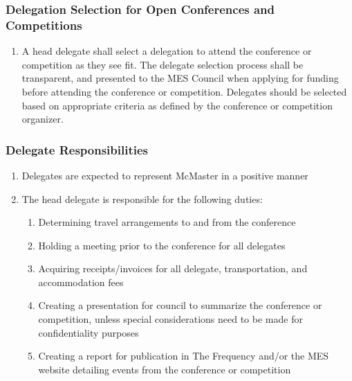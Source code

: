 \subsubsection{Delegation Selection for Open Conferences and Competitions}
\label{delegation-selection-for-open-conferences-and-competitions}

\begin{enumerate}
 \item
  A head delegate shall select a delegation to attend the conference or competition as they see fit. The delegate selection process shall be transparent, and presented to the MES Council when applying for funding before attending the conference or competition. Delegates should be selected based on appropriate criteria as defined by the conference or competition organizer.
\end{enumerate}

\subsubsection{Delegate Responsibilities}
\label{delegate-responsibilities}
\begin{enumerate}
 \item
  Delegates are expected to represent McMaster in a positive manner
 \item
  The head delegate is responsible for the following duties:

  \begin{enumerate}
   \item
    Determining travel arrangements to and from the conference
   \item
    Holding a meeting prior to the conference for all delegates
   \item
    Acquiring receipts/invoices for all delegate, transportation, and accommodation fees
   \item
    Creating a presentation for council to summarize the conference or competition, unless special considerations need to be made for confidentiality purposes
   \item
    Creating a report for publication in The Frequency and/or the MES website detailing events from the conference or competition

  \end{enumerate}
\end{enumerate}


